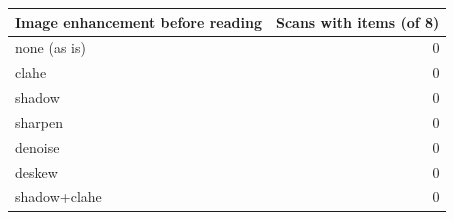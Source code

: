 \begin{tabular}{@{}lr@{}}
\toprule
Image enhancement before reading & Scans with items (of 8) \\
\midrule
none (as is) & 0 \\
clahe & 0 \\
shadow & 0 \\
sharpen & 0 \\
denoise & 0 \\
deskew & 0 \\
shadow+clahe & 0 \\
\bottomrule
\end{tabular}

